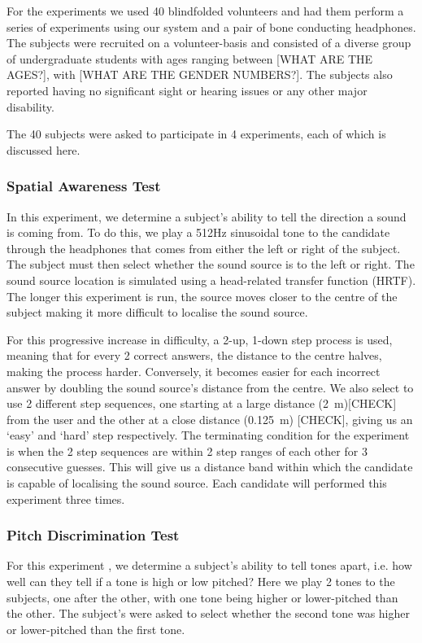 \documentclass[format=sigconf, review=true, screen=true, anonymous=true]{acmart}
\begin{document}
For the experiments we used 40 blindfolded volunteers and had them perform a series of experiments using our system and a pair of bone conducting headphones. The subjects were recruited on a volunteer-basis and consisted of a diverse group of undergraduate students with ages ranging between [WHAT ARE THE AGES?], with [WHAT ARE THE GENDER NUMBERS?]. The subjects also reported having no significant sight or hearing issues or any other major disability. 

The 40 subjects were asked to participate in 4 experiments, each of which is discussed here.

\subsubsection{Spatial Awareness Test}

In this experiment, we determine a subject's ability to tell the direction a sound is coming from. To do this, we play a 512Hz sinusoidal tone to the candidate through the headphones that comes from either the left or right of the subject. The subject must then select whether the sound source is to the left or right. The sound source location is simulated using a head-related transfer function (HRTF). The longer this experiment is run, the source moves closer to the centre of the subject making it more difficult to localise the sound source. 

For this progressive increase in difficulty, a 2-up, 1-down step process is used, meaning that for every 2 correct answers, the distance to the centre halves, making the process harder. Conversely, it becomes easier for each incorrect answer by doubling the sound source's distance from the centre. We also select to use 2 different step sequences, one starting at a large distance (\SI{2}{\m})[CHECK] from the user and the other at a close distance (\SI{0.125}{\m}) [CHECK], giving us an `easy' and `hard' step respectively. The terminating condition for the experiment is when the 2 step sequences are within 2 step ranges of each other for 3 consecutive guesses. This will give us a distance band within which the candidate is capable of localising the sound source. Each candidate will performed this experiment three times. 

\subsubsection{Pitch Discrimination Test}

For this experiment , we determine a subject's ability to tell tones apart, i.e. how well can they tell if a tone is high or low pitched? Here we play 2 tones to the subjects, one after the other, with one tone being higher or lower-pitched than the other. The subject's were asked to select whether the second tone was higher or lower-pitched than the first tone.
\end{document}
